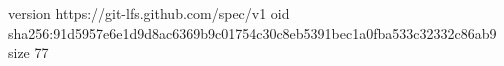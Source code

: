 version https://git-lfs.github.com/spec/v1
oid sha256:91d5957e6e1d9d8ac6369b9c01754c30c8eb5391bec1a0fba533c32332c86ab9
size 77

